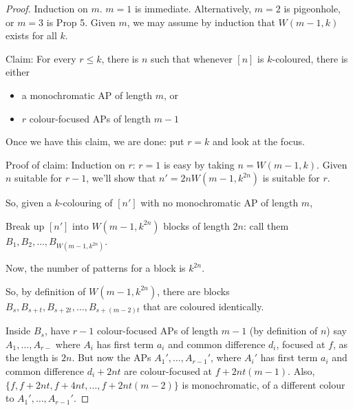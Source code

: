 \documentclass{article}
\begin{document}
\begin{proof}
  Induction on $m$. $m=1$ is immediate. Alternatively, $m=2$ is pigeonhole, or $m=3$ is Prop 5.
  Given $m$, we may assume by induction that $W(m-1, k)$ exists for all $k$.

  Claim: For every $r \leq k$, there is $n$ such that whenever $[n]$ is $k$-coloured, there is either
  \begin{itemize}
    \item a monochromatic AP of length $m$, or
      \item $r$ colour-focused APs of length $m-1$
  \end{itemize}
  Once we have this claim, we are done: put $r=k$ and look at the focus.

  Proof of claim: Induction on $r$: $r=1$ is easy by taking $n=W(m-1,k)$.
  Given $n$ suitable for $r-1$, we'll show that $n' = 2n W(m-1, k^{2n})$ is suitable for $r$.

  So, given a $k$-colouring of $[n']$ with no monochromatic AP of length $m$,

  Break up $[n']$ into $W(m-1, k^{2n})$ blocks of length $2n$: call them $B_1, B_2, \dotsc, B_{W(m-1, k^{2n})}$.

  Now, the number of patterns for a block is $k^{2n}$.
  \begin{center}
  \end{center}
  So, by definition of $W(m-1, k^{2n})$, there are blocks $B_s, B_{s+t}, B_{s+2t}, \dotsc, B_{s+(m-2) t}$ that are coloured identically.

  Inside $B_s$, have $r-1$ colour-focused APs of length $m-1$ (by definition of $n$) say $A_1, \dotsc, A_{r-}$ where $A_i$ has first term $a_i$ and common difference $d_i$, focused at $f$, as the length is $2n$.
  But now the APs $A_1', \dotsc, A_{r-1}'$, where $A_i'$ has first term $a_i$ and common difference $d_i + 2nt$ are colour-focused at $f+2nt(m-1)$.
  Also, $\{f, f+2nt, f+4nt, \dotsc, f+2nt(m-2)\}$ is monochromatic, of a different colour to $A_1', \dotsc, A_{r-1}'$.
\end{proof}
\printindex
\end{document}
